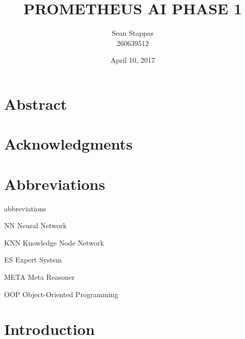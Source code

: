 \documentclass[titlepage,11pt]{article}
\title{\textbf{\uppercase{Prometheus AI Phase 1}}}
\author{
Sean Stappas \\
260639512
}
\date{April 10, 2017}
\begin{document}
\lstset{language=Java} 
\sloppy

\maketitle

\section*{Abstract}

\section*{Acknowledgments}

\clearpage
\tableofcontents
\clearpage

\twocolumn

\section*{Abbreviations}

\begin{labeling}{abbreviations}
\item [NN] Neural Network
\item [KNN] Knowledge Node Network
\item [ES] Expert System
\item [META] Meta Reasoner
\item [OOP] Object-Oriented Programming
\end{labeling}

\section{Introduction} \label{sec:intro}
\end{document}
